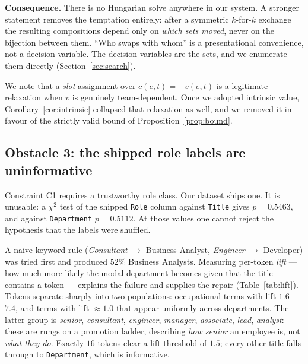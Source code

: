 \documentclass[conference]{IEEEtran}
\newcommand{\vv}{v}
\begin{document}
\noindent\textbf{Consequence.} There is no Hungarian solve anywhere in our system.
A stronger statement removes the temptation entirely: after a symmetric $k$-for-$k$
exchange the resulting compositions depend only on \emph{which sets moved}, never
on the bijection between them. ``Who swaps with whom'' is a presentational
convenience, not a decision variable. The decision variables are the sets, and we
enumerate them directly (Section~\ref{sec:search}).

We note that a \emph{slot} assignment over $c(e,t)=-\vv(e,t)$ is a legitimate
relaxation when $\vv$ is genuinely team-dependent. Once we adopted intrinsic
value, Corollary~\ref{cor:intrinsic} collapsed that relaxation as well, and we
removed it in favour of the strictly valid bound of
Proposition~\ref{prop:bound}.

\subsection{Obstacle 3: the shipped role labels are uninformative}

Constraint C1 requires a trustworthy role class. Our dataset ships one. It is
unusable: a $\chi^2$ test of the shipped \texttt{Role} column against
\texttt{Title} gives $p=0.5463$, and against \texttt{Department} $p=0.5112$. At
those values one cannot reject the hypothesis that the labels were shuffled.

A naive keyword rule (\textit{Consultant} $\to$ Business Analyst,
\textit{Engineer} $\to$ Developer) was tried first and produced $52\%$ Business
Analysts. Measuring per-token \emph{lift} --- how much more likely the modal
department becomes given that the title contains a token --- explains the
failure and supplies the repair (Table~\ref{tab:lift}). Tokens separate sharply
into two populations: occupational terms with lift $1.6$--$7.4$, and terms with
lift $\approx 1.0$ that appear uniformly across departments. The latter group is
\textit{senior}, \textit{consultant}, \textit{engineer}, \textit{manager},
\textit{associate}, \textit{lead}, \textit{analyst}: these are rungs on a
promotion ladder, describing \emph{how senior} an employee is, not \emph{what they
do}. Exactly $16$ tokens clear a lift threshold of $1.5$; every other title falls
through to \texttt{Department}, which is informative.
\end{document}
